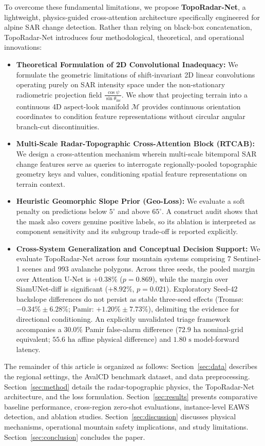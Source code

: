 To overcome these fundamental limitations, we propose \textbf{TopoRadar-Net}, a lightweight, physics-guided cross-attention architecture specifically engineered for alpine SAR change detection. Rather than relying on black-box concatenation, TopoRadar-Net introduces four methodological, theoretical, and operational innovations:
\begin{itemize}
    \item \textbf{Theoretical Formulation of 2D Convolutional Inadequacy:} We formulate the geometric limitations of shift-invariant 2D linear convolutions operating purely on SAR intensity space under the non-stationary radiometric projection field $\frac{\cos \psi}{\sin \theta_{\text{inc}}}$. We show that projecting terrain into a continuous 4D aspect-look manifold $\mathcal{M}$ provides continuous orientation coordinates to condition feature representations without circular angular branch-cut discontinuities.
    \item \textbf{Multi-Scale Radar-Topographic Cross-Attention Block (RTCAB):} We design a cross-attention mechanism wherein multi-scale bitemporal SAR change features serve as queries to interrogate regionally-pooled topographic geometry keys and values, conditioning spatial feature representations on terrain context.
    \item \textbf{Heuristic Geomorphic Slope Prior (Geo-Loss):} We evaluate a soft penalty on predictions below $5^\circ$ and above $65^\circ$. A construct audit shows that the mask also covers genuine positive labels, so its ablation is interpreted as component sensitivity and its subgroup trade-off is reported explicitly.
    \item \textbf{Cross-System Generalization and Conceptual Decision Support:} We evaluate TopoRadar-Net across four mountain systems comprising 7 Sentinel-1 scenes and 993 avalanche polygons. Across three seeds, the pooled margin over Attention U-Net is $+0.38\%$ ($p=0.869$), while the margin over SiamUNet-diff is significant ($+8.92\%$, $p=0.021$). Exploratory Seed-42 backslope differences do not persist as stable three-seed effects (Troms{\o}: $-0.34\% \pm 6.28\%$; Pamir: $+1.20\% \pm 7.73\%$), delimiting the evidence for directional conditioning. An explicitly unvalidated triage framework accompanies a $30.0\%$ Pamir false-alarm difference ($72.9\text{ ha}$ nominal-grid equivalent; $55.6\text{ ha}$ affine physical difference) and $1.80\text{ s}$ model-forward latency.
\end{itemize}

The remainder of this article is organized as follows: Section~\ref{sec:data} describes the regional settings, the AvalCD benchmark dataset, and data preprocessing. Section~\ref{sec:method} details the radar-topographic physics, the TopoRadar-Net architecture, and the loss formulation. Section~\ref{sec:results} presents comparative baseline performance, cross-region zero-shot evaluations, instance-level EAWS detection, and ablation studies. Section~\ref{sec:discussion} discusses physical mechanisms, operational mountain safety implications, and study limitations. Section~\ref{sec:conclusion} concludes the paper.
